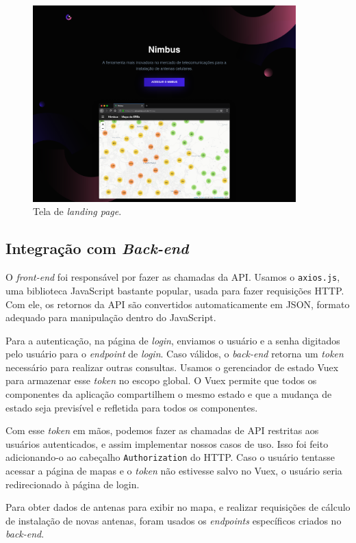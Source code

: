 \documentclass[]{politex}
\begin{document}
\begin{figure}[H]
    \centering
    \includegraphics[width=4in]{imagens/landing-page}
    \caption{Tela de \textit{landing page}.}
    \label{fig:landing_page}
\end{figure}

\subsection{Integração com \textit{Back-end}}

O \textit{front-end} foi responsável por fazer as chamadas da API. Usamos o
\texttt{axios.js}, uma biblioteca JavaScript bastante popular, usada para fazer
requisições HTTP. Com ele, os retornos da API são convertidos automaticamente em
JSON, formato adequado para manipulação dentro do JavaScript.

Para a autenticação, na página de \textit{login}, enviamos o usuário e a senha
digitados pelo usuário para o \textit{endpoint} de \textit{login}. Caso válidos,
o \textit{back-end} retorna um \textit{token} necessário para realizar outras
consultas. Usamos o gerenciador de estado Vuex para armazenar esse
\textit{token} no escopo global. O Vuex permite que todos os componentes da
aplicação compartilhem o mesmo estado e que a mudança de estado seja previsível
e refletida para todos os componentes.

Com esse \textit{token} em mãos, podemos fazer as chamadas de API restritas aos
usuários autenticados, e assim implementar nossos casos de uso. Isso foi feito
adicionando-o ao cabeçalho \texttt{Authorization} do HTTP. Caso o usuário
tentasse acessar a página de mapas e o \textit{token} não estivesse salvo no
Vuex, o usuário seria redirecionado à página de login.

Para obter dados de antenas para exibir no mapa, e realizar requisições de
cálculo de instalação de novas antenas, foram usados os \textit{endpoints}
específicos criados no \textit{back-end}.
\end{document}
